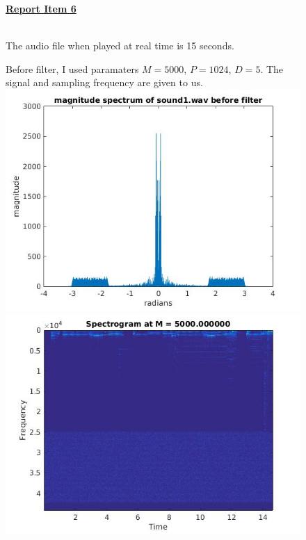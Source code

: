 \documentclass{article}
\begin{document}
\begin{figure}[H]
  \color{red}
  \underline{\textbf{Report Item 6}}
  \color{black}

\\ The audio file when played at real time is 15 seconds.
\end{figure}

\begin{figure}[H]
Before filter, I used paramaters $M = 5000$, $P = 1024$, $D = 5$. The signal and sampling frequency are given to us.
\includegraphics[scale = .5]{report6_1}
\includegraphics[scale = .5]{report6_2}
\end{figure}
\end{document}
